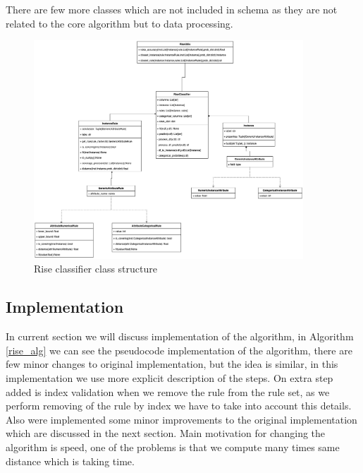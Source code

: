 \documentclass{article}
\begin{document}
 There are few more classes which are not included in schema as they are not related to the core algorithm but to 
 data processing.
\begin{figure}[htbp]
    \centering
    \includegraphics[width=0.9\textwidth]{media/sel.png}
    \caption{Rise classifier class structure}
    \label{fig:class_structure}
\end{figure}








\subsection{Implementation}
In current section we will discuss implementation of the algorithm, in Algorithm \ref{rise_alg} we can see the pseudocode
implementation of the algorithm, there are few minor changes to original implementation, but the idea is similar, in this 
implementation we use more explicit description of the steps. On extra step added is index validation when we remove
the rule from the rule set, as we perform removing of the rule by index we have to take into account this details. Also
were implemented some minor improvements to the original implementation which are discussed in the next section.
Main motivation for changing the algorithm is speed, one of the problems is that we compute many times same distance which
is taking time.
\end{document}

